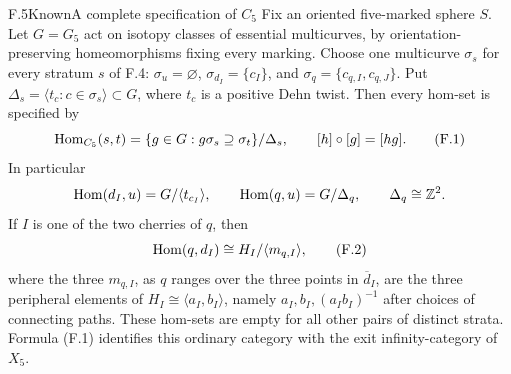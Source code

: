 \begin{statement}{F.5}{Known}{A complete specification of $C_5$}
Fix an oriented five-marked sphere $S$.  Let $G=G_5$ act on isotopy
classes of essential multicurves, by orientation-preserving
homeomorphisms fixing every marking.  Choose one multicurve $\sigma_s$
for every stratum $s$ of F.4: $\sigma_u=\varnothing$,
$\sigma_{d_I}=\{c_I\}$, and
$\sigma_q=\{c_{q,I},c_{q,J}\}$.  Put
$\Delta_s=\langle t_c:c\in\sigma_s\rangle\subset G$, where $t_c$ is a
positive Dehn twist.  Then every hom-set is specified by
\[
 \operatorname{Hom}_{C_5}(s,t)=
 \{g\in G:g\sigma_s\supseteq\sigma_t\}/\Delta_s,
 \qquad [h]\circ[g]=[hg].                         \tag{F.1}
\]
In particular
\[
 \operatorname{Hom}(d_I,u)=G/\langle t_{c_I}\rangle,
 \qquad \operatorname{Hom}(q,u)=G/\Delta_q,
 \qquad \Delta_q\cong\mathbb Z^2.
\]
If $I$ is one of the two cherries of $q$, then
\[
 \operatorname{Hom}(q,d_I)\cong H_I/\langle m_{q,I}\rangle,
                                                        \tag{F.2}
\]
where the three $m_{q,I}$, as $q$ ranges over the three points in
$\overline d_I$, are the three peripheral elements of
$H_I\cong\langle a_I,b_I\rangle$, namely $a_I,b_I,(a_Ib_I)^{-1}$
after choices of connecting paths.  These hom-sets are empty for all
other pairs of distinct strata.  Formula (F.1) identifies this ordinary
category with the exit infinity-category of $X_5$.
\end{statement}
